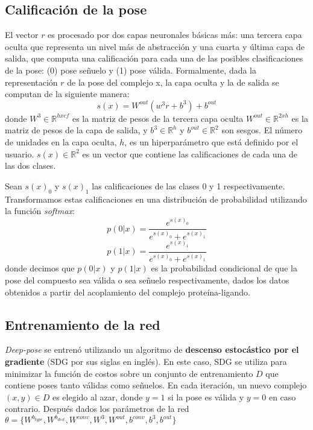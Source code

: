 \subsection{Calificación de la pose}
El vector $r$ es procesado por dos capas neuronales básicas más: una
tercera capa oculta que representa un nivel más de abstracción y una
cuarta y última capa de salida, que computa una calificación para cada
una de las posibles clasificaciones de la pose: (0) pose señuelo y (1)
pose válida. Formalmente, dada la representación $r$ de la pose del
complejo x, la capa oculta y la de salida se computan de la siguiente
manera:
\begin{equation}
  s(x) = W^{out}(w^3r + b^3) + b^{out}
\end{equation}
donde $W^3 \in \mathbb{R}^{hxcf}$ es la matriz de pesos de la tercera
capa oculta $W^{out} \in \mathbb{R}^{2xh}$ es la matriz de pesos de la
capa de salida, y $b^3 \in \mathbb{R}^h$ y $b^{out} \in \mathbb{R}^2$ son
sesgos. El número de unidades en la capa oculta, $h$, es un hiperparámetro
que está definido por el usuario. $s(x) \in \mathbb{R}^2$ es un vector
que contiene las calificaciones de cada una de las dos clases.

Sean $s(x)_0$ y $s(x)_1$ las calificaciones de las clases 0 y 1
respectivamente. Transformamos estas calificaciones en una
distribución de probabilidad utilizando la función \textit{softmax}:
\begin{equation}
  p(0|x) = \frac{e^{s(x)_0}}{e^{s(x)_0}+e^{s(x)_1}}
\end{equation}
\begin{equation}
  p(1|x) = \frac{e^{s(x)_1}}{e^{s(x)_0}+e^{s(x)_1}}
\end{equation}
donde decimos que $p(0|x)$ y $p(1|x)$ es la probabilidad condicional
de que la pose del compuesto sea válida o sea señuelo respectivamente,
dados los datos obtenidos a partir del acoplamiento del complejo
proteína-ligando.

\subsection{Entrenamiento de la red}
\textit{Deep-pose} se entrenó utilizando un algoritmo de
\textbf{descenso estocástico por el gradiente} (SDG por sus siglas en
inglés). En este caso, SDG se utiliza para minimizar la función de
costos sobre un conjunto de entrenamiento $D$ que contiene poses tanto
válidas como señuelos. En cada iteración, un nuevo complejo $(x,y) \in D$
es elegido al azar, donde $y=1$ si la pose es válida y $y=0$ en caso
contrario. Después dados los parámetros de la red
$\theta = \{W^{b_{type}}, W^{b_{dist}}, W^{conv}, W^3, W^{out}, b^{conv}, b^{3}, b^{out}\}$
